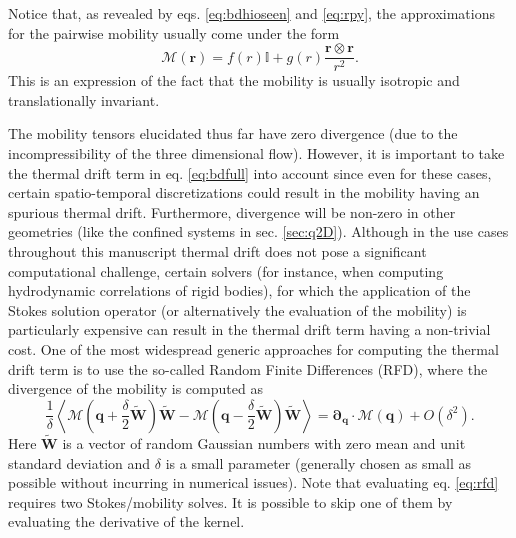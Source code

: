 \documentclass[ twoside,openright,titlepage,numbers=noenddot,%
headinclude,footinclude,cleardoublepage=empty,abstract=on,
BCOR=5mm,paper=a4,fontsize=11pt, dvipsnames
]{scrreprt}
\renewcommand{\vec}[1]{\bm{#1}}
\newcommand{\tens}[1]{\bm{\mathcal{#1}}}
\newcommand{\noise}{\widetilde{W}}
\newcommand{\ppos}{q}
\begin{document}
Notice that, as revealed by eqs. \eqref{eq:bdhioseen} and \eqref{eq:rpy}, the approximations for the pairwise mobility usually come under the form
\begin{equation}
  \label{eq:bdhimobgeneral}
  \tens{M}(\vec{r}) = f(r)\mathbb{I} + g(r)\frac{\vec{r}\otimes\vec{r}}{r^2}.
\end{equation}
This is an expression of the fact that the mobility is usually isotropic and translationally invariant.

The mobility tensors elucidated thus far have zero divergence (due to the incompressibility of the three dimensional flow). However, it is important to take the thermal drift term in eq. \eqref{eq:bdfull} into account since even for these cases, certain spatio-temporal discretizations could result in the mobility having an spurious thermal drift. Furthermore, divergence will be non-zero in other geometries (like the confined systems in sec. \ref{sec:q2D}).
Although in the use cases throughout this manuscript thermal drift does not pose a significant computational challenge, certain solvers (for instance, when computing hydrodynamic correlations of rigid bodies\cite{Westwood2021}), for which the application of the Stokes solution operator (or alternatively the evaluation of the mobility) is particularly expensive can result in the thermal drift term having a non-trivial cost.
One of the most widespread generic approaches for computing the thermal drift term is to use the so-called Random Finite Differences (RFD)\cite{Delong2014}, where the divergence of the mobility is computed as
\begin{equation}
  \label{eq:rfd}
    \frac{1}{\delta}\left\langle \tens{M}\left(\vec{\ppos}+\frac{\delta}{2}\vec{\noise}\right)\vec{\noise} - \tens{M}\left(\vec{\ppos}-\frac{\delta}{2}\vec{\noise}\right)\vec{\noise}\right\rangle
    = \vec{\partial}_{\vec{\ppos}}\cdot\tens{M}(\vec{\ppos}) + O(\delta^2).
\end{equation}
Here $\vec{\noise}$ is a vector of random Gaussian numbers with zero mean and unit standard deviation and $\delta$ is a small parameter (generally chosen as small as possible without incurring in numerical issues).
Note that evaluating eq. \eqref{eq:rfd} requires two Stokes/mobility solves. It is possible to skip one of them by evaluating the derivative of the kernel\cite{Delong2014}.
\end{document}
